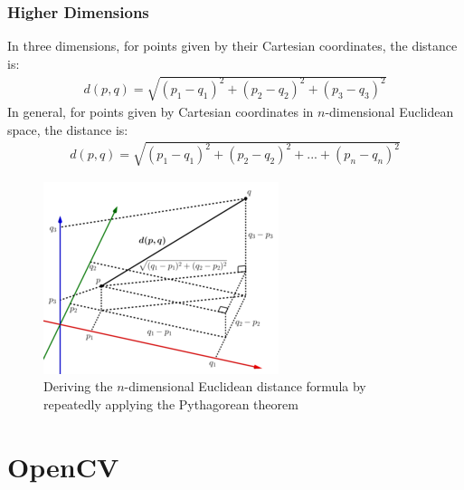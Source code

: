         \subsubsection{Higher Dimensions}
            In three dimensions, for points given by their Cartesian coordinates, the distance is:
            \begin{align}
                d(p,q) = \sqrt{(p_1 - q_1)^2 + (p_2 - q_2)^2 + (p_3 - q_3)^2}
            \end{align}
            In general, for points given by Cartesian coordinates in $n$-dimensional Euclidean space, the distance is:
            \begin{align}
                d(p,q) = \sqrt{(p_1 - q_1)^2 + (p_2 - q_2)^2 + ... + (p_n - q_n)^2}
            \end{align}
            \begin{figure}[H]
                \centering
                \includegraphics[width=0.6\linewidth]{img/dimensional.png}
                \caption{Deriving the $n$-dimensional Euclidean distance formula by repeatedly applying the Pythagorean theorem}
            \end{figure}

\section{OpenCV}
